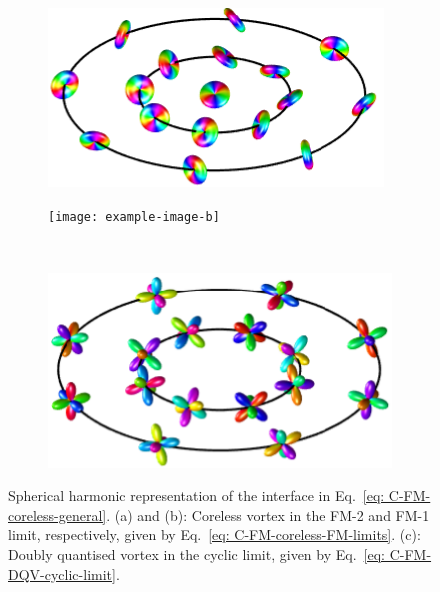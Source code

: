 \begin{figure}
    \centering
    \begin{subfigure}{0.49\textwidth}
        \includegraphics[width=\textwidth]
        {gfx/ch-spin2/C-FM=2_coreless_FM_init_spherical.pdf}
        \caption{\label{subfig: C-FM-FM2-coreless}}
    \end{subfigure}
    \begin{subfigure}{0.49\textwidth}
        \texttt{[image: example-image-b]}
        \caption{\label{subfig: C-FM-FM1-coreless}}
    \end{subfigure}\\
    \begin{subfigure}{0.49\textwidth}
        \includegraphics[width=\textwidth]
        {gfx/ch-spin2/C-FM=2_coreless_cyclic_init_spherical.pdf}
        \caption{\label{subfig: C-FM-cyclic-DQV}}
    \end{subfigure}
    \caption{\label{fig: C-FM-coreless-initial-states}Spherical harmonic
        representation of the interface in Eq.~\eqref{eq: C-FM-coreless-general}.
        (a) and (b): Coreless vortex in the FM-2 and FM-1 limit, respectively,
        given by Eq.~\eqref{eq: C-FM-coreless-FM-limits}.
        (c): Doubly quantised vortex in the cyclic limit, given by
        Eq.~\eqref{eq: C-FM-DQV-cyclic-limit}.}
\end{figure}
